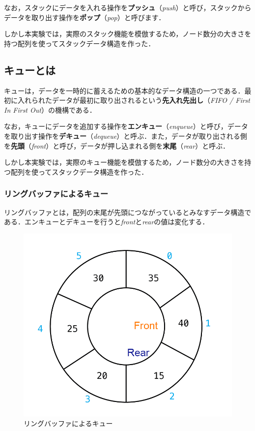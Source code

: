 \documentclass[a4j, titlepage]{jarticle}
\begin{document}
    なお，スタックにデータを入れる操作を\textbf{プッシュ}（\textit{push}）と呼び，スタックからデータを取り出す操作を\textbf{ポップ}（\textit{pop}）と呼びます\cite{bib:boyoh}．%

    しかし本実験では，実際のスタック機能を模倣するため，ノード数分の大きさを持つ配列を使ってスタックデータ構造を作った．

    \subsection{キューとは}
    キューは，データを一時的に蓄えるための基本的なデータ構造の一つである．最初に入れられたデータが最初に取り出されるという\textbf{先入れ先出し}（\textit{FIFO / First In First Out}）の機構である．\cite{bib:boyoh}
    
    なお，キューにデータを追加する操作を\textbf{エンキュー}（\textit{enqueue}）と呼び，データを取り出す操作を\textbf{デキュー}（\textit{dequeue}）と呼ぶ．また，データが取り出される側を\textbf{先頭}（\textit{front}）と呼び，データが押し込まれる側を\textbf{末尾}（\textit{rear}）と呼ぶ\cite{bib:boyoh}．

    しかし本実験では，実際のキュー機能を模倣するため，ノード数分の大きさを持つ配列を使ってスタックデータ構造を作った．
    \clearpage
        \subsubsection{リングバッファによるキュー}
        リングバッファとは，配列の末尾が先頭につながっているとみなすデータ構造である\cite{bib:boyoh}．エンキューとデキューを行うと\textit{front}と\textit{rear}の値は変化する．
        \begin{figure}[htb]
            \begin{center}
              \includegraphics[scale=0.25]{../image/ringbuffer1.png}
              \caption{リングバッファによるキュー}
              \label{img:ringqueue}
            \end{center}
          \end{figure}
\end{document}
